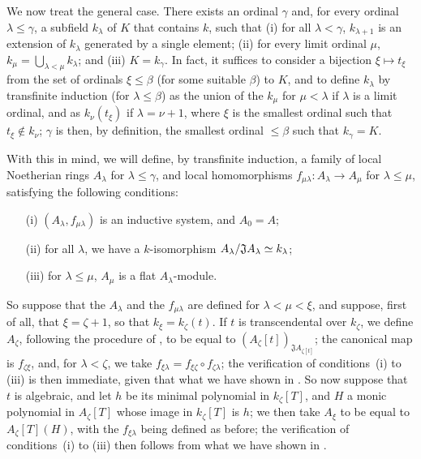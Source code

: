 \begin{env}[10.3.1.4]
\label{0.10.3.1.4}
We now treat the general case.
There exists an ordinal $\gamma$ and, for every ordinal $\lambda\leq\gamma$, a subfield $k_\lambda$ of $K$ that contains $k$, such that (i) for all $\lambda<\gamma$, $k_{\lambda+1}$ is an extension of $k_\lambda$ generated by a single element; (ii) for every limit ordinal $\mu$, $k_\mu=\bigcup_{\lambda<\mu}k_\lambda$; and (iii) $K=k_\gamma$.
In fact, it suffices to consider a bijection $\xi\mapsto t_\xi$ from the set of ordinals $\xi\leq\beta$ (for some suitable $\beta$) to $K$, and to define $k_\lambda$ by transfinite induction (for $\lambda\leq\beta$) as the union of the $k_\mu$ for $\mu<\lambda$ if $\lambda$ is a limit ordinal, and as $k_\nu(t_\xi)$ if $\lambda=\nu+1$, where $\xi$ is the smallest ordinal such that $t_\xi\not\in k_\nu$;
$\gamma$ is then, by definition, the smallest ordinal $\leq\beta$ such that $k_\gamma=K$.

With this in mind, we will define, by transfinite induction, a family of local Noetherian rings $A_\lambda$ for $\lambda\leq\gamma$, and local homomorphisms $f_{\mu\lambda}:A_\lambda\to A_\mu$ for $\lambda\leq\mu$, satisfying the following conditions:
\begin{enumerate}
  \item[(i)] $(A_\lambda,f_{\mu\lambda})$ is an inductive system, and $A_0=A$;
  \item[(ii)] for all $\lambda$, we have a $k$-isomorphism $A_\lambda/\mathfrak{J}A_\lambda\simeq k_\lambda$;
  \item[(iii)] for $\lambda\leq\mu$, $A_\mu$ is a flat $A_\lambda$-module.
\end{enumerate}

So suppose that the $A_\lambda$ and the $f_{\mu\lambda}$ are defined for $\lambda<\mu<\xi$, and suppose, first of all, that $\xi=\zeta+1$, so that $k_\xi=k_\zeta(t)$.
If $t$ is transcendental over $k_\zeta$, we define $A_\zeta$, following the procedure of , to be equal to $(A_\zeta[t])_{\mathfrak{J}A_{\zeta[t]}}$;
the canonical map is $f_{\zeta\xi}$, and, for $\lambda<\zeta$, we take $f_{\xi\lambda}=f_{\xi\zeta}\circ f_{\zeta\lambda}$;
the verification of conditions~(i) to (iii) is then immediate, given that what we have shown in .
So now suppose that $t$ is algebraic, and let $h$ be its minimal polynomial in $k_\zeta[T]$, and $H$ a monic polynomial in $A_\zeta[T]$ whose image in $k_\zeta[T]$ is $h$;
we then take $A_\xi$ to be equal to $A_\zeta[T](H)$, with the $f_{\xi\lambda}$ being defined as before;
the verification of conditions~(i) to (iii) then follows from what we have shown in .


\end{env}
